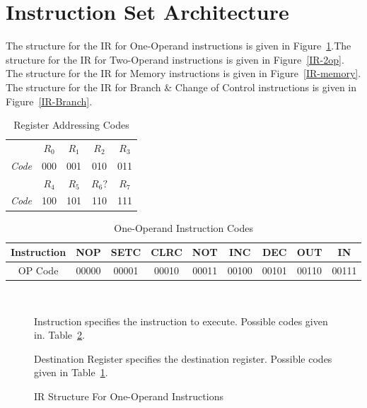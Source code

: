 \documentclass[12pt]{article}
\theoremstyle{plain}
\theoremstyle{definition}
\begin{document}
\section{Instruction Set Architecture}
    The structure for the IR for One-Operand instructions is given in Figure~\ref{IR-1op}.The structure for the IR for Two-Operand instructions is given in Figure~\ref{IR-2op}. The structure for the IR for Memory instructions is given in Figure~\ref{IR-memory}. The structure for the IR for Branch & Change of Control instructions is given in Figure~\ref{IR-Branch}.
    \begin{table}[H]
        \centering
        \begin{tabular}{c|c|c|c|c|}
            \cline{2-5}
                            & $R_0$ & $R_1$ & $R_2$ & $R_3$ \\ \cline{2-5} 
            \textit{Code}   & 000      & 001            & 010            & 011     \\ \cline{2-5} 
                            & $R_4$ & $R_5$ & $R_6?$ & $R_7$ \\ \cline{2-5} 
            \textit{Code}   & 100      & 101            & 110            & 111     \\ \cline{2-5} 
        \end{tabular}
        \caption{Register Addressing Codes}
        \label{reg-addr-codes}
    \end{table}
    \begin{table}[H]
        \centering
        \begin{tabular}{|c|c|c|c|c|c|c|c|c|}
            \hline
            Instruction  & NOP & SETC & CLRC  & NOT & INC & DEC & OUT & IN  \\ \hline
            OP Code     & 00000 & 00001 & 00010 & 00011 & 00100 & 00101 & 00110 & 00111 \\ \hline
        \end{tabular}
        \caption{One-Operand Instruction Codes}
        \label{One_Op Opcodes}
    \end{table}
    
    \begin{figure}[H]
        \centering
        \caption{IR Structure For One-Operand Instructions}
        \label{IR-1op}
        \vspace{0.5 cm}
        \\
        \vspace{0.5 cm}
        \begin{regdesc}\begin{reglist}
            \item [Instruction] specifies the instruction to execute. Possible codes given in. Table~\ref{One_Op Opcodes}.
            \item [Destination Register] specifies the destination register. Possible codes given in Table~\ref{reg-addr-codes}.
        \end{reglist}\end{regdesc}
    \end{figure}
    
\end{document}
